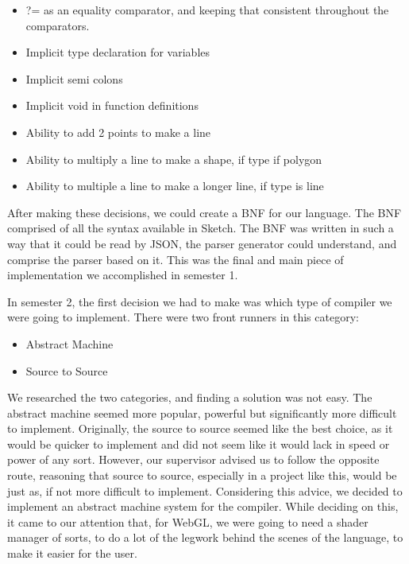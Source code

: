 \documentclass{l3proj}
\begin{document}
\begin{itemize}
\item ?= as an equality comparator, and keeping that consistent throughout the comparators.
\item Implicit type declaration for variables
\item Implicit semi colons
\item Implicit void in function definitions
\item Ability to add 2 points to make a line
\item Ability to multiply a line to make a shape, if type if polygon
\item Ability to multiple a line to make a longer line, if type is line
\end{itemize}

After making these decisions, we could create a BNF for our language. The BNF comprised of all the syntax available in Sketch. The BNF was written in such a way that it could be read by JSON, the parser generator could understand, and comprise the parser based on it. This was the final and main piece of implementation we accomplished in semester 1.

In semester 2, the first decision we had to make was which type of compiler we were going to implement. There were two front runners in this category:
\begin{itemize}
\item Abstract Machine
\item Source to Source
\end{itemize}
We researched the two categories, and finding a solution was not easy. The abstract machine seemed more popular, powerful but significantly more difficult to implement. Originally, the source to source seemed like the best choice, as it would be quicker to implement and did not seem like it would lack in speed or power of any sort. However, our supervisor advised us to follow the opposite route, reasoning that source to source, especially in a project like this, would be just as, if not more difficult to implement. Considering this advice, we decided to implement an abstract machine system for the compiler. While deciding on this, it came to our attention that, for WebGL, we were going to need a shader manager of sorts, to do a lot of the legwork behind the scenes of the language, to make it easier for the user.
\end{document}
